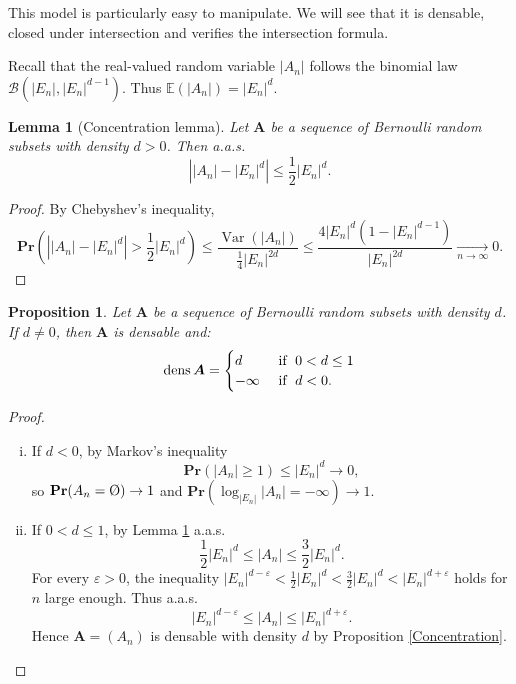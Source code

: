 \documentclass{article}
\DeclareMathOperator{\dens}{dens}
\DeclareMathOperator{\Var}{Var}
\newcommand{\vide}{\textup{\O}}
\newcommand{\bs}{\boldsymbol}
\newcommand{\tendvers}{\xrightarrow[n\to\infty]{}}
\def\Pr{\mathbf{Pr}}
\newtheorem{lem}[thm]{Lemma}
\newtheorem{prop}[thm]{Proposition}
\theoremstyle{remark}
\begin{document}
This model is particularly easy to manipulate. We will see that it is densable, closed under intersection and verifies the intersection formula.

Recall that the real-valued random variable $|A_n|$ follows the binomial law $\mathcal{B}(|E_n|,|E_n|^{d-1})$. Thus $\mathbb{E}(|A_n|) = |E_n|^d$.

\begin{lem}[Concentration lemma]\label{concentration Bernoulli} Let $\bs{A}$ be a sequence of Bernoulli random subsets with density $d>0$. Then a.a.s.
\[\left||A_n| - |E_n|^d\right|\leq \frac{1}{2}|E_n|^{d}.\]
\end{lem}
\begin{proof}
By Chebyshev's inequality,
\[\Pr\left(\left||A_n|-|E_n|^d\right| > \frac{1}{2}|E_n|^d\right)\leq
\frac{\Var(|A_n|)}{\frac{1}{4}|E_n|^{2d}} \leq
\frac{4|E_n|^d(1-|E_n|^{d-1})}{|E_n|^{2d}}\tendvers 0.\]
\end{proof}

\begin{prop} \label{densBernoulli} Let $\bs{A}$ be a sequence of Bernoulli random subsets with density $d$. If $d\neq 0$, then $\bs A$ is densable and:
\[\dens\bs{A} = 
    \begin{cases}   d & \textup{ if } \; 0<d\leq 1 \\
                    -\infty & \textup{ if }\;  d<0.
    \end{cases}\]
\end{prop}


\begin{proof}
\begin{enumerate} [(i)]
    \item If $d<0$, by Markov's inequality \[\Pr(|A_n|\geq 1) \leq |E_n|^d\to 0,\] so $\Pr(A_n = \vide)\to 1$ and $\Pr(\log_{|E_n|}|A_n| = -\infty)\to 1$.
    \item If $0< d\leq 1$, by Lemma \ref{concentration Bernoulli} a.a.s.    \[\frac{1}{2}|E_n|^d\leq|A_n|\leq\frac{3}{2}|E_n|^d.\]
    For every $\varepsilon>0$, the inequality $|E_n|^{d-\varepsilon} < \frac{1}{2}|E_n|^d < \frac{3}{2}|E_n|^d < |E_n|^{d+\varepsilon}$ holds for $n$ large enough. Thus a.a.s.
    \[|E_n|^{d-\varepsilon}\leq|A_n|\leq|E_n|^{d+\varepsilon}.\]
    Hence $\bs A =(A_n)$ is densable with density $d$ by Proposition \ref{Concentration}.
\end{enumerate}
\end{proof}
\end{document}
